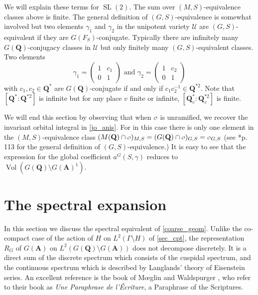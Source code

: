 \documentclass[11pt]{amsart}
\def\A{\mathbf A}
\def\Q{\mathbf Q}
\def\o{\scalebox{0.8}{$\scriptstyle\mathcal{O}$}}
\def\UUU{\mathcal U}
\def\cb#1{{\color{blue}#1}}
\def\bs{\setminus} 			%
\def\Ltwo{L^2}
\def\sl{\operatorname{SL}}
\def\vol{\operatorname{Vol}}
\theoremstyle{remark}
\begin{document}
\cb{
We will explain these terms for $\sl(2)$. The sum over $(M, S)$-equivalence classes above is finite. The general definition of $(G, S)$-equivalence is somewhat involved but two elements $\gamma_1$ and $\gamma_2$ in the unipotent variety $\UUU$ are $(G, S)$-equivalent if they are $G(F_S)$-conjugate. Typically there are infinitely many $G(\Q)$-conjugacy classes in $\UUU$ but only finitely many $(G, S)$-equivalent classes. Two elements
\[ \gamma_1 = \begin{pmatrix} 1 & c_1 \\ 0 & 1 \end{pmatrix} \text{ and } \gamma_2 = \begin{pmatrix} 1 & c_2 \\ 0 & 1 \end{pmatrix}
\]
with $c_1, c_2 \in \Q^*$ are $G(\Q)$-conjugate if and only if $c_1 c_2^{-1} \in \Q^{*2}$. Note that $[\Q^* : \Q^{*2}]$ is infinite but for any place $v$ finite or infinite, $[\Q_v^* : \Q_v^{*2}]$ is finite. }

\cb{
We will end this section by observing that when $\o$ is unramified, we recover the invariant orbital integral in \cref{jo_anis}. For in this case there is only one element in the $(M, S)$-equivalence class $(M(\Q)\cap \o)_{M, S} = (G(\Q)\cap \o)_{G, S} = \o_{G, S}$ (see \cite{clay}*{p. 113} for the general definition of $(G, S)$-equivalence.) It is easy to see that the expression for the global coefficient $a^G(S, \gamma)$ reduces to $\vol(G(\Q)\bs G(\A)^1)$. 
}


\section{The spectral expansion}

In this section we discuss the spectral equivalent of \cref{coarse_geom}. Unlike the co-compact case of the action of $H$ on $\Ltwo(\Gamma \bs H)$ of \cref{sec_cpt}, the representation $R_G$ of $G(\A)$ on $\Ltwo(G(\Q)\bs G(\A))$ does not decompose discretely. It is a direct sum of the discrete spectrum which consists of the cuspidal spectrum, and the continuous spectrum which is described by Langlands' theory of Eisenstein series. An excellent reference is the book of M{\oe}glin and Waldspurger \cite{MW}, who refer to their book as \textit{Une Paraphrase de l'\'{E}criture}, a Paraphrase of the Scriptures. 
\end{document}
